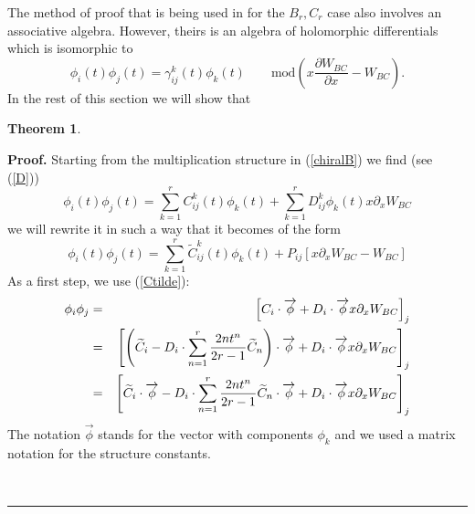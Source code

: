\documentclass[a4paper,11pt]{article}
\newtheorem{theorem}{Theorem}
\newenvironment{proof}[1][Proof]{\textbf{#1.} }{\ \rule{0.5em}{0.5em}}
\numberwithin{equation}{section}
\begin{document}
The method of proof that is being used in \cite{MARS-MIRO-MORO:2000}
for the $B_{r},C_{r}$ case also involves an associative algebra. However,
theirs is an algebra of holomorphic differentials which is isomorphic to 
\begin{equation}
\phi _{i}(t)\phi _{j}(t)=\gamma _{ij}^{k}(t)\phi _{k}(t)\qquad \mbox{mod}(x%
\dfrac{\partial W_{BC}}{\partial x}-W_{BC}).
\end{equation}
In the rest of this section we will show that

\begin{theorem}
$\qquad \qquad \qquad \qquad \qquad $
\end{theorem}

\begin{proof}
Starting from the multiplication structure in (\ref{chiralB}) we find (see (\ref{D})) 
\begin{equation}
\phi _{i}(t)\phi _{j}(t)=\sum_{k=1}^{r}C_{ij}^{k}(t)\phi
_{k}(t)+\sum_{k=1}^{r}D_{ij}^{k}\phi _{k}(t)x\partial _{x}W_{BC}
\label{algebra with D}
\end{equation}
we will rewrite it in such a way that it becomes of the form 
\begin{equation}
\phi _{i}(t)\phi _{j}(t)=\sum_{k=1}^{r}\widetilde{C}_{ij}^{k}(t)\phi
_{k}(t)+P_{ij}\left[ x\partial _{x}W_{BC}-W_{BC}\right] 
\end{equation}
As a first step, we use (\ref{Ctilde}): 
\begin{eqnarray}
\phi _{i}\phi _{j} &=&\left[ C_{i}\cdot \overrightarrow{\phi }+D_{i}\cdot 
\overrightarrow{\phi }x\partial _{x}W_{BC}\right] _{j}  \notag \\
&=&\left[ \left( \widetilde{C}_{i}-D_{i}\cdot \sum_{n=1}^{r}\frac{2nt^{n}}{%
2r-1}\widetilde{C}_{n}\right) \cdot \overrightarrow{\phi }+D_{i}\cdot 
\overrightarrow{\phi }x\partial _{x}W_{BC}\right] _{j}  \notag \\
&=&\left[ \widetilde{C}_{i}\cdot \overrightarrow{\phi }-D_{i}\cdot
\sum_{n=1}^{r}\frac{2nt^{n}}{2r-1}\widetilde{C}_{n}\cdot \overrightarrow{%
\phi }+D_{i}\cdot \overrightarrow{\phi }x\partial _{x}W_{BC}\right]
_{j}
\label{second term}
\end{eqnarray}
The notation $\overrightarrow{\phi }$ stands for the vector with components $%
\phi _{k}$ and we used a matrix notation for the structure constants.


\end{proof}
\end{document}
